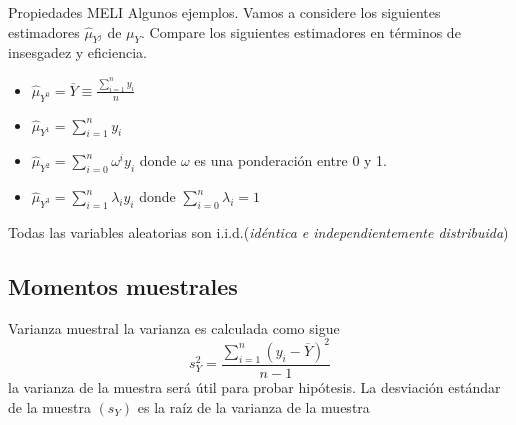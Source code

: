 \begin{frame}{Propiedades MELI}
	Algunos ejemplos. Vamos a considere los siguientes estimadores $\hat{\mu}_{Y^{j}}$ de $\mu_{Y}$. Compare los siguientes estimadores en términos de insesgadez y eficiencia.
		\begin{itemize}
			\item $\hat{\mu}_{Y^{0}}= \overline{Y} \equiv \frac{\sum \limits_{i=1}^{n}y_{i}}{n} $
			\item $\hat{\mu}_{Y^{1}}= \sum \limits_{i=1}^{n}y_{i}$
			\item $\hat{\mu}_{Y^{2}}= \sum \limits_{i=0}^{n}\omega^{i}y_{i}$ donde $\omega$ es una ponderación entre 0 y 1.
			\item $\hat{\mu}_{Y^{3}}= \sum \limits_{i=1}^{n}\lambda_{i}y_{i}$ donde $\sum_{i=0}^{n}\lambda_{i}=1$
		\end{itemize}
	Todas las variables aleatorias son i.i.d.(\textit{idéntica e independientemente distribuida})
\end{frame}

\subsection{Momentos muestrales}
\begin{frame}{Varianza muestral}
	la varianza es calculada como sigue
		$$ s_{Y}^{2} = \frac{\sum \limits_{i=1}^{n}(y_{i}-\overline{Y})^2}{n-1}$$ 
	la varianza de la muestra será útil para probar hipótesis. La desviación estándar de la muestra $(s_{Y})$ es la raíz de la varianza de la muestra
\end{frame}

